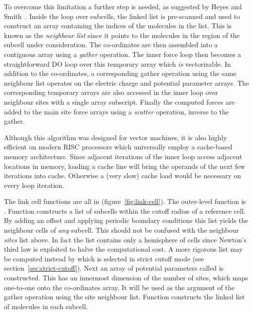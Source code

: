 \documentclass[a4paper,twoside]{report}
\begin{document}
To overcome this limitation a further step is needed, as suggested by
Heyes and Smith~\cite{heyes:87}.  Inside the loop over subcells, the
linked list is pre-scanned and used to construct an array containing
the indices of the molecules in the list.  This is known as the
\emph{neighbour list} since it points to the molecules in the region
of the subcell under consideration. The co-ordinates are then
assembled into a contiguous array using a \emph{gather} operation.  The
inner force loop then becomes a straightforward DO loop over this
temporary array which \emph{is} vectorizable.  In addition to the
co-ordinates, a corresponding gather operation using the same neighbour
list operates on the electric charge and potential parameter arrays.
The corresponding temporary arrays are also accessed in the inner loop
over neighbour sites with a single array subscript.  Finally the
computed forces are added to the main site force arrays using a
\emph{scatter} operation, inverse to the gather.

Although this algorithm was designed for vector machines, it is also
highly efficient on modern RISC processors which universally employ a
cache-based memory architecture.  Since adjacent iterations of the
inner loop access adjacent locations in memory, loading a cache line
will bring the operands of the next few iterations into cache.
Otherwise a (very slow) cache load would be necessary on every loop
iteration. 

The link cell functions are all in 
(figure~\ref{fig:link-cell}).  The outer-level function is
.  Function 
constructs a list of subcells within the cutoff radius of a reference
cell.  By adding an offset and applying periodic boundary conditions
this list yields the neighbour cells of \emph{any} subcell.  This
should not be confused with the neighbour \emph{sites} list above.  In
fact the list contains only a hemisphere of cells since Newton's third
law is exploited to halve the computational cost.  A more rigorous
list may be computed instead by 
which is selected in strict cutoff mode (see
section~\ref{sec:strict-cutoff}).  Next an array of potential
parameters called  is constructed.  This has an innermost
dimension of the number of sites, which maps one-to-one onto the
co-ordinates array. It will be used as the argument of the gather
operation using the site neighbour list.  Function
 constructs the linked list of molecules in each
subcell.
\end{document}
